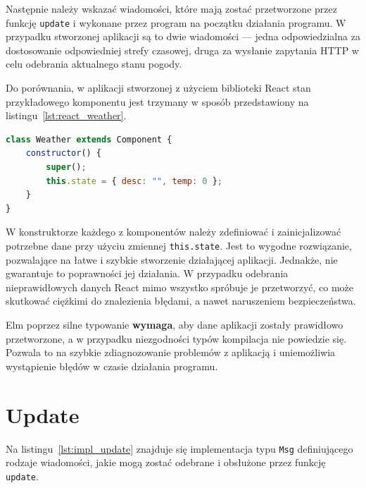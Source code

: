 \documentclass[twoside,a4paper]{report}
\begin{document}
Następnie należy wskazać wiadomości, które mają zostać przetworzone przez funkcję \texttt{update} i wykonane przez program na początku działania programu.
W przypadku stworzonej aplikacji są to dwie wiadomości --- jedna odpowiedzialna za dostosowanie odpowiedniej strefy czasowej, druga za wysłanie zapytania HTTP w celu odebrania aktualnego stanu pogody.

Do porównania, w aplikacji stworzonej z użyciem biblioteki React stan przykładowego komponentu jest trzymany w sposób przedstawiony na listingu~\ref{lst:react_weather}.
\begin{lstlisting}[caption={Stan komponentu \texttt{Weather}},label={lst:react_weather},language={JavaScript}]
class Weather extends Component {
    constructor() {
        super();
        this.state = { desc: "", temp: 0 };
    }
}
\end{lstlisting}
W konstruktorze każdego z komponentów należy zdefiniować i zainicjalizować potrzebne dane przy użyciu zmiennej \texttt{this.state}.
Jest to wygodne rozwiązanie, pozwalające na łatwe i szybkie stworzenie działającej aplikacji.
Jednakże, nie gwarantuje to poprawności jej działania.
W przypadku odebrania nieprawidłowych danych React mimo wszystko spróbuje je przetworzyć, co może skutkować ciężkimi do znalezienia błędami, a nawet naruszeniem bezpieczeństwa.

Elm poprzez silne typowanie \textbf{wymaga}, aby dane aplikacji zostały prawidłowo przetworzone, a w przypadku niezgodności typów kompilacja nie powiedzie się.
Pozwala to na szybkie zdiagnozowanie problemów z aplikacją i uniemożliwia wystąpienie błędów w czasie działania programu.

\section{Update}
Na listingu~\ref{lst:impl_update} znajduje się implementacja typu \texttt{Msg} definiującego rodzaje wiadomości, jakie mogą zostać odebrane i obsłużone przez funkcję \texttt{update}.
\end{document}
